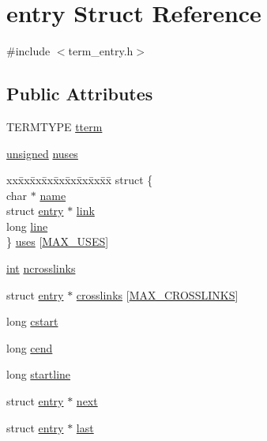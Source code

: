 \hypertarget{structentry}{\section{entry Struct Reference}
\label{structentry}
}


{\ttfamily \#include $<$term\-\_\-entry.\-h$>$}

\subsection*{Public Attributes}
\begin{DoxyCompactItemize}
\item 
T\-E\-R\-M\-T\-Y\-P\-E \hyperlink{structentry_acd8b278ac1cb8f1c978f181d04005635}{tterm}
\item 
\hyperlink{curses_8priv_8h_aca40206900cfc164654362fa8d4ad1e6}{unsigned} \hyperlink{structentry_a7c062d016b6006a4d3bb116a8c666979}{nuses}
\item 
\begin{tabbing}
xx\=xx\=xx\=xx\=xx\=xx\=xx\=xx\=xx\=\kill
struct \{\\
\>char $\ast$ \hyperlink{structentry_aef8962564a1a313a7ddc320bb4ed739c}{name}\\
\>struct \hyperlink{structentry}{entry} $\ast$ \hyperlink{structentry_a6e74ef745be8d53435a6b5b8daf1a8a6}{link}\\
\>long \hyperlink{structentry_a536059da6a4f904c4133f255b3135558}{line}\\
\} \hyperlink{structentry_a76c5a573e90efbfe635b829d637286bb}{uses} \mbox{[}\hyperlink{term__entry_8h_a853ed980666a2b683fef310c0a2d2ce1}{MAX\_USES}\mbox{]}\\

\end{tabbing}\item 
\hyperlink{term__entry_8h_ad65b480f8c8270356b45a9890f6499ae}{int} \hyperlink{structentry_a86bb80a62128828458c0383fa1ee4725}{ncrosslinks}
\item 
struct \hyperlink{structentry}{entry} $\ast$ \hyperlink{structentry_a2536efb4714caefb0b9fbef8de54fb4d}{crosslinks} \mbox{[}\hyperlink{term__entry_8h_a0c3aab314d3a72a595e6b43f8a56ac12}{M\-A\-X\-\_\-\-C\-R\-O\-S\-S\-L\-I\-N\-K\-S}\mbox{]}
\item 
long \hyperlink{structentry_a3963df64fffa3b62ca7da5945e085f37}{cstart}
\item 
long \hyperlink{structentry_a22144edd8a9caa3ac988cc0b4d1a039d}{cend}
\item 
long \hyperlink{structentry_abe330cabf8e854d92a05f5406d8d4bd8}{startline}
\item 
struct \hyperlink{structentry}{entry} $\ast$ \hyperlink{structentry_a6ba6b7d14932763dcb0df242b5ff2dfd}{next}
\item 
struct \hyperlink{structentry}{entry} $\ast$ \hyperlink{structentry_a18d98d27a6599f7d645e3096f01812f5}{last}
\end{DoxyCompactItemize}


